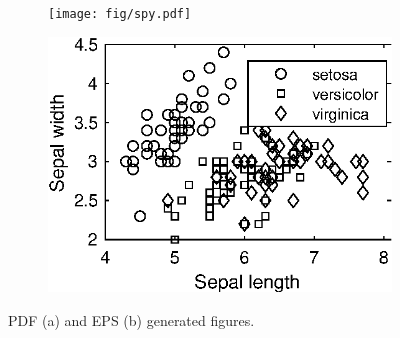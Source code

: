 	\begin{figure}[H]
		\centering
		\begin{subfigure}[b]{\twofig\textwidth} 
			\texttt{[image: fig/spy.pdf]}
		\end{subfigure}
		\hfil
		\begin{subfigure}[b]{\twofig\textwidth}
			\includegraphics{fig/gscatter.eps}
		\end{subfigure}
		\caption{PDF (a) and EPS (b) generated figures. \label{fig:math-stuff}}
	\end{figure}